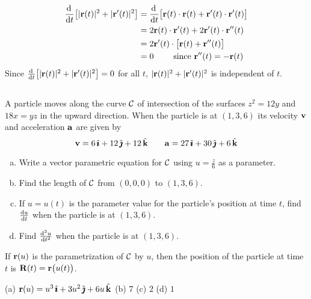 \begin{solution}
\begin{align*}
\diff{}{t}\big[|\vr(t)|^2+|\vr'(t)|^2\big]
&=\diff{}{t}\big[\vr(t)\cdot\vr(t)+\vr'(t)\cdot\vr'(t)\big]\\
&=2\vr(t)\cdot\vr'(t)+2\vr'(t)\cdot\vr''(t)\\
&=2\vr'(t)\cdot\big[\vr(t)+\vr''(t)\big]\\
&=0\qquad \text{ since $\vr''(t)=-\vr(t)$ }
\end{align*}
Since $\diff{}{t}\big[|\vr(t)|^2+|\vr'(t)|^2\big]=0$ for all
$t$, $|\mathbf{r}(t)|^2+|\mathbf{r}'(t)|^2$ is independent of $t$.
\end{solution}




\subsection*{\Application}


\begin{question}[M317 2000A] %
 A particle moves along the curve $\mathcal{C}$ of intersection of
the surfaces $z^2=12y$ and $18x=yz$ in the upward direction. When the particle
is at $(1,3,6)$ its velocity $\mathbf{v}$ and acceleration $\mathbf{a}$ are given by
$$
\mathbf{v} =6\,\hat{\pmb{\imath}}+12\,\hat{\pmb{\jmath}}+12\,\hat{\mathbf{k}}\qquad
\mathbf{a} = 27\,\hat{\pmb{\imath}}+30\,\hat{\pmb{\jmath}}+6\,\hat{\mathbf{k}}
$$
\begin{enumerate}[(a)]
\item
 Write a vector parametric equation for $\mathcal{C}$ using 
$u=\frac{z}{6}$ as a parameter.
\item
 Find the length of $\mathcal{C}$ from $(0,0,0)$ to $(1,3,6)$.
\item
 If $u=u(t)$ is the parameter value for the particle's position
at time $t$, find $\diff{u}{t}$ when the particle is at $(1,3,6)$.
\item
 Find $\difftwo{u}{t}$ when the particle is at $(1,3,6)$.
\end{enumerate}
\end{question}

\begin{hint} 
If $\mathbf{r}(u)$ is the parametrization of $\mathcal{C}$ by $u$, then
the position of the particle at time $t$ is $\mathbf{R}(t) = \mathbf{r}\big(u(t)\big)$.
\end{hint}

\begin{answer} 
(a)  $\mathbf{r}(u)=u^3\,\hat{\pmb{\imath}}+3u^2\,\hat{\pmb{\jmath}}+6u\,\hat{\mathbf{k}}$\qquad
(b)  $7$\qquad
(c)  $2$\qquad
(d)  $1$
\end{answer}


